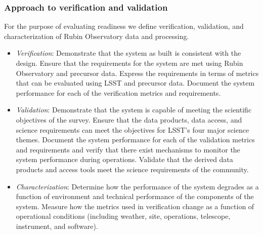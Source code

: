
\subsubsection{Approach to verification and validation}


For the purpose of evaluating readiness we define verification, validation, and characterization of Rubin Observatory data and processing.

\begin{itemize}

	\item {\it Verification}: Demonstrate that the system as built is consistent with the design. Ensure that the requirements for the system are met using Rubin Observatory and precursor data. Express the requirements in terms of metrics that can be evaluated using LSST and precursor data. Document the system performance for each of the verification metrics and requirements.

	\item {\it Validation}: Demonstrate that the system is capable of meeting the scientific objectives of the survey. Ensure that the data products, data access, and science requirements can meet the objectives for LSST's four major science themes. Document the system performance for each of the validation metrics and requirements and verify that there exist mechanisms to monitor the system performance during operations. Validate that the derived data products and access tools meet the science requirements of the community.

	\item {\it Characterization}: Determine how the performance of the system degrades as a function of environment and technical performance of the components of the system. Measure how the metrics used in verification change as a function of operational conditions (including weather, site, operations, telescope, instrument, and software).

\end{itemize}

